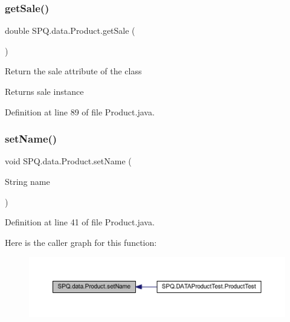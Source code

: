 \subsubsection{\texorpdfstring{get\+Sale()}{getSale()}\hspace{0.1cm}{\footnotesize\ttfamily [2/2]}}
{\footnotesize\ttfamily double S\+P\+Q.\+data.\+Product.\+get\+Sale (\begin{DoxyParamCaption}{ }\end{DoxyParamCaption})}

Return the sale attribute of the class \begin{DoxyReturn}{Returns}
sale instance 
\end{DoxyReturn}


Definition at line 89 of file Product.\+java.

\mbox{\label{class_s_p_q_1_1data_1_1_product_a257a5e290694db0588a9ac9aad598360}} 
\subsubsection{\texorpdfstring{set\+Name()}{setName()}\hspace{0.1cm}{\footnotesize\ttfamily [1/2]}}
{\footnotesize\ttfamily void S\+P\+Q.\+data.\+Product.\+set\+Name (\begin{DoxyParamCaption}\item[{String}]{name }\end{DoxyParamCaption})}



Definition at line 41 of file Product.\+java.

Here is the caller graph for this function\+:\nopagebreak
\begin{figure}[H]
\begin{center}
\leavevmode
\includegraphics[width=350pt]{class_s_p_q_1_1data_1_1_product_a257a5e290694db0588a9ac9aad598360_icgraph}
\end{center}
\end{figure}
\mbox{\label{class_s_p_q_1_1data_1_1_product_a257a5e290694db0588a9ac9aad598360}} 
